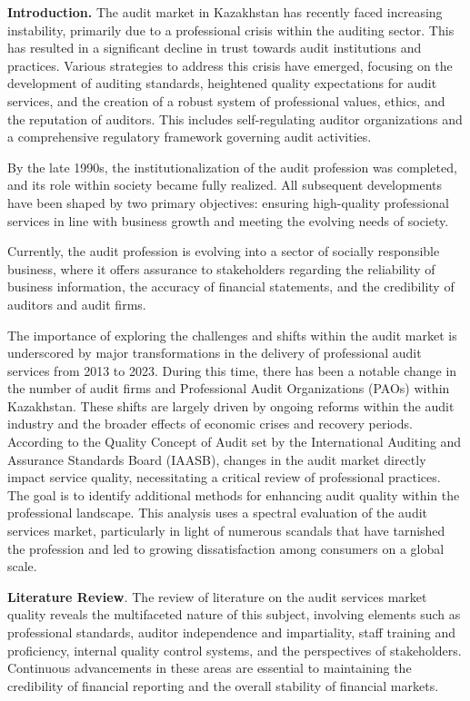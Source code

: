 \begin{multicols}{2}
\textbf{Introduction.} The audit market in Kazakhstan has recently faced
increasing instability, primarily due to a professional crisis within
the auditing sector. This has resulted in a significant decline in trust
towards audit institutions and practices. Various strategies to address
this crisis have emerged, focusing on the development of auditing
standards, heightened quality expectations for audit services, and the
creation of a robust system of professional values, ethics, and the
reputation of auditors. This includes self-regulating auditor
organizations and a comprehensive regulatory framework governing audit
activities.

By the late 1990s, the institutionalization of the audit profession was
completed, and its role within society became fully realized. All
subsequent developments have been shaped by two primary objectives:
ensuring high-quality professional services in line with business growth
and meeting the evolving needs of society.

Currently, the audit profession is evolving into a sector of socially
responsible business, where it offers assurance to stakeholders
regarding the reliability of business information, the accuracy of
financial statements, and the credibility of auditors and audit firms.

The importance of exploring the challenges and shifts within the audit
market is underscored by major transformations in the delivery of
professional audit services from 2013 to 2023. During this time, there
has been a notable change in the number of audit firms and Professional
Audit Organizations (PAOs) within Kazakhstan. These shifts are largely
driven by ongoing reforms within the audit industry and the broader
effects of economic crises and recovery periods. According to the
Quality Concept of Audit set by the International Auditing and Assurance
Standards Board (IAASB), changes in the audit market directly impact
service quality, necessitating a critical review of professional
practices. The goal is to identify additional methods for enhancing
audit quality within the professional landscape. This analysis uses a
spectral evaluation of the audit services market, particularly in light
of numerous scandals that have tarnished the profession and led to
growing dissatisfaction among consumers on a global scale.

\textbf{Literature Review}\emph{.} The review of literature on the audit
services market quality reveals the multifaceted nature of this subject,
involving elements such as professional standards, auditor independence
and impartiality, staff training and proficiency, internal quality
control systems, and the perspectives of stakeholders. Continuous
advancements in these areas are essential to maintaining the credibility
of financial reporting and the overall stability of financial markets.


\end{multicols}
